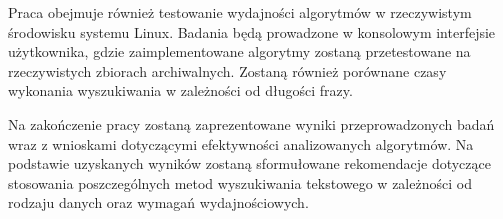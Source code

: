 Praca obejmuje również testowanie wydajności algorytmów w rzeczywistym 
środowisku systemu Linux. Badania będą prowadzone w konsolowym interfejsie 
użytkownika, gdzie zaimplementowane algorytmy zostaną przetestowane na 
rzeczywistych zbiorach archiwalnych. Zostaną również porównane czasy wykonania
wyszukiwania w zależności od długości frazy.

Na zakończenie pracy zostaną zaprezentowane wyniki przeprowadzonych badań wraz 
z wnioskami dotyczącymi efektywności analizowanych algorytmów. Na podstawie 
uzyskanych wyników zostaną sformułowane rekomendacje dotyczące stosowania 
poszczególnych metod wyszukiwania tekstowego w zależności od rodzaju danych 
oraz wymagań wydajnościowych.


